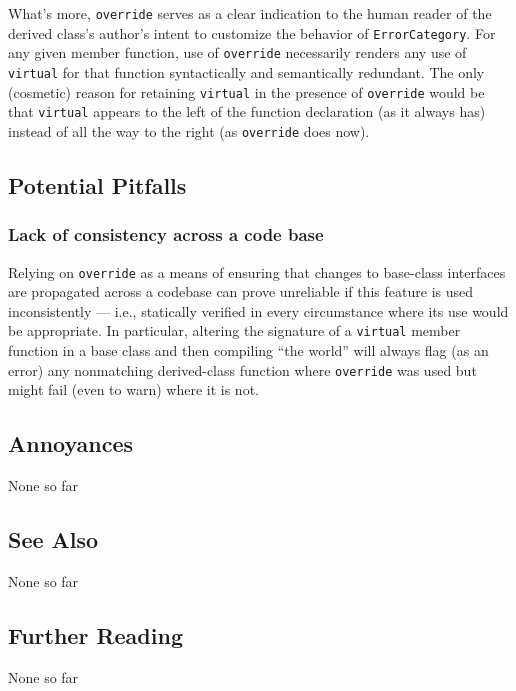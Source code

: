 \noindent What's more, \texttt{override} serves as a clear indication to the human
reader of the derived class's author's intent to customize the
behavior of \texttt{ErrorCategory}. For any given member function, use
of \texttt{override} necessarily renders any use of \texttt{virtual} for
that function syntactically and semantically redundant. The only
(cosmetic) reason for retaining \texttt{virtual} in the presence of
\texttt{override} would be that \texttt{virtual} appears to the left of
the function declaration (as it always has) instead of all the way to
the right (as \texttt{override} does now).

\subsection[Potential Pitfalls]{Potential Pitfalls}\label{potential-pitfalls}

\subsubsection[Lack of consistency across a code base]{Lack of consistency across a code base}\label{lack-of-consistency-across-a-codebase}

Relying on \texttt{override} as a means of ensuring that changes to
base-class interfaces are propagated across a codebase can prove
unreliable if this feature is used inconsistently --- i.e., statically
verified in every circumstance where its use would be appropriate. In
particular, altering the signature of a \texttt{virtual} member function
in a base class and then compiling ``the world'' will always flag (as an
error) any nonmatching derived-class function where \texttt{override}
was used but might fail (even to warn) where it is not.

\subsection[Annoyances]{Annoyances}\label{annoyances}

None so far

\subsection[See Also]{See Also}\label{see-also}

None so far

\subsection[Further Reading]{Further Reading}\label{further-reading}

None so far


